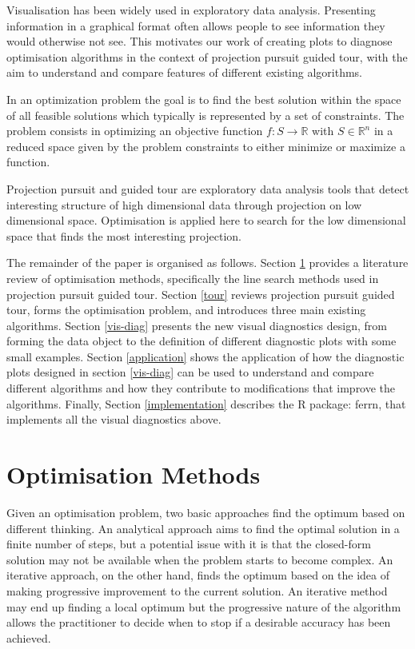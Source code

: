\documentclass[12pt]{article}
\begin{document}
Visualisation has been widely used in exploratory data analysis. Presenting information in a graphical format often allows people to see information they would otherwise not see. This motivates our work of creating plots to diagnose optimisation algorithms in the context of projection pursuit guided tour, with the aim to understand and compare features of different existing algorithms.

In an optimization problem the goal is to find the best solution within the space of all feasible solutions which typically is represented by a set of constraints. The problem consists in optimizing an objective function \(f: S \rightarrow \mathbb{R}\) with \(S \in \mathbb{R}^n\) in a reduced space given by the problem constraints to either minimize or maximize a function.

Projection pursuit and guided tour are exploratory data analysis tools that detect interesting structure of high dimensional data through projection on low dimensional space. Optimisation is applied here to search for the low dimensional space that finds the most interesting projection.

The remainder of the paper is organised as follows.
Section \ref{optim} provides a literature review of optimisation methods, specifically the line search methods used in projection pursuit guided tour.
Section \ref{tour} reviews projection pursuit guided tour, forms the optimisation problem, and introduces three main existing algorithms.
Section \ref{vis-diag} presents the new visual diagnostics design, from forming the data object to the definition of different diagnostic plots with some small examples.
Section \ref{application} shows the application of how the diagnostic plots designed in section \ref{vis-diag} can be used to understand and compare different algorithms and how they contribute to modifications that improve the algorithms.
Finally, Section \ref{implementation} describes the R package: ferrn, that implements all the visual diagnostics above.

\hypertarget{optim}{%
\section{Optimisation Methods}\label{optim}}

Given an optimisation problem, two basic approaches find the optimum based on different thinking.
An analytical approach aims to find the optimal solution in a finite number of steps, but a potential issue with it is that the closed-form solution may not be available when the problem starts to become complex.
An iterative approach, on the other hand, finds the optimum based on the idea of making progressive improvement to the current solution. An iterative method may end up finding a local optimum but the progressive nature of the algorithm allows the practitioner to decide when to stop if a desirable accuracy has been achieved.
\end{document}
